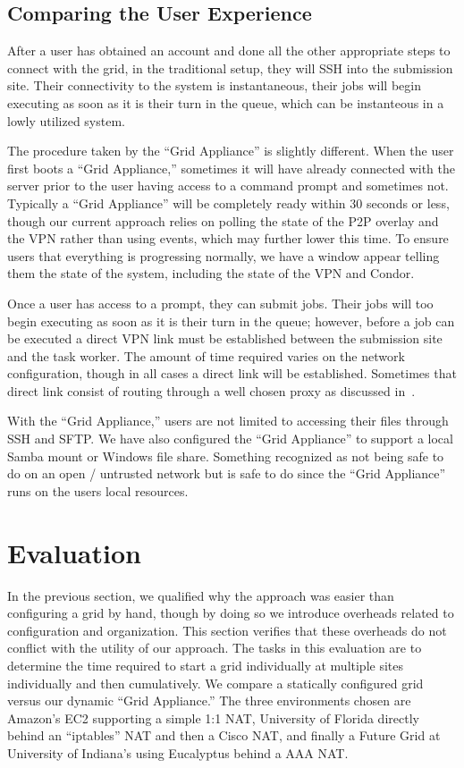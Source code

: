 \documentclass[conference]{IEEEtran}
\begin{document}
\subsection{Comparing the User Experience}

After a user has obtained an account and done all the other appropriate steps
to connect with the grid, in the traditional setup, they will SSH into the
submission site.  Their connectivity to the system is instantaneous, their jobs
will begin executing as soon as it is their turn in the queue, which can be
instanteous in a lowly utilized system.

The procedure taken by the ``Grid Appliance'' is slightly different.  When the
user first boots a ``Grid Appliance,'' sometimes it will have already connected
with the server prior to the user having access to a command prompt and
sometimes not.  Typically a ``Grid Appliance'' will be completely ready within
30 seconds or less, though our current approach relies on polling the state of
the P2P overlay and the VPN rather than using events, which may further lower
this time.  To ensure users that everything is progressing normally, we have a
window appear telling them the state of the system, including the state of the
VPN and Condor.

Once a user has access to a prompt, they can submit jobs.  Their jobs will too
begin executing as soon as it is their turn in the queue; however, before a job
can be executed a direct VPN link must be established between the submission
site and the task worker.  The amount of time required varies on the network
configuration, though in all cases a direct link will be established.
Sometimes that direct link consist of routing through a well chosen proxy as
discussed in~\cite{groupvpn}.

With the ``Grid Appliance,'' users are not limited to accessing their files
through SSH and SFTP.  We have also configured the ``Grid Appliance'' to
support a local Samba mount or Windows file share.  Something recognized as not
being safe to do on an open / untrusted network but is safe to do since the
``Grid Appliance'' runs on the users local resources.

\section{Evaluation}
\label{evaluation}

In the previous section, we qualified why the approach was easier than
configuring a grid by hand, though by doing so we introduce overheads related
to configuration and organization.  This section verifies that these overheads
do not conflict with the utility of our approach.  The tasks in this evaluation
are to determine the time required to start a grid individually at multiple
sites individually and then cumulatively.  We compare a statically configured
grid versus our dynamic ``Grid Appliance.''  The three environments chosen are
Amazon's EC2 supporting a simple 1:1 NAT, University of Florida directly behind
an ``iptables'' NAT and then a Cisco NAT, and finally a Future Grid at
University of Indiana's using Eucalyptus behind a AAA NAT.
\end{document}
